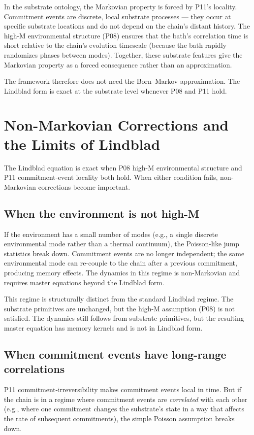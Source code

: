\documentclass[11pt,a4paper]{article}
\begin{document}
In the substrate ontology, the Markovian property is forced by P11's locality. Commitment events are discrete, local substrate processes --- they occur at specific substrate locations and do not depend on the chain's distant history. The high-M environmental structure (P08) ensures that the bath's correlation time is short relative to the chain's evolution timescale (because the bath rapidly randomizes phases between modes). Together, these substrate features give the Markovian property as a forced consequence rather than an approximation.

The framework therefore does not need the Born--Markov approximation. The Lindblad form is exact at the substrate level whenever P08 and P11 hold.

\section{Non-Markovian Corrections and the Limits of Lindblad}

The Lindblad equation is exact when P08 high-M environmental structure and P11 commitment-event locality both hold. When either condition fails, non-Markovian corrections become important.

\subsection{When the environment is not high-M}

If the environment has a small number of modes (e.g., a single discrete environmental mode rather than a thermal continuum), the Poisson-like jump statistics break down. Commitment events are no longer independent; the same environmental mode can re-couple to the chain after a previous commitment, producing memory effects. The dynamics in this regime is non-Markovian and requires master equations beyond the Lindblad form.

This regime is structurally distinct from the standard Lindblad regime. The substrate primitives are unchanged, but the high-M assumption (P08) is not satisfied. The dynamics still follows from substrate primitives, but the resulting master equation has memory kernels and is not in Lindblad form.

\subsection{When commitment events have long-range correlations}

P11 commitment-irreversibility makes commitment events local in time. But if the chain is in a regime where commitment events are \emph{correlated} with each other (e.g., where one commitment changes the substrate's state in a way that affects the rate of subsequent commitments), the simple Poisson assumption breaks down.
\end{document}
